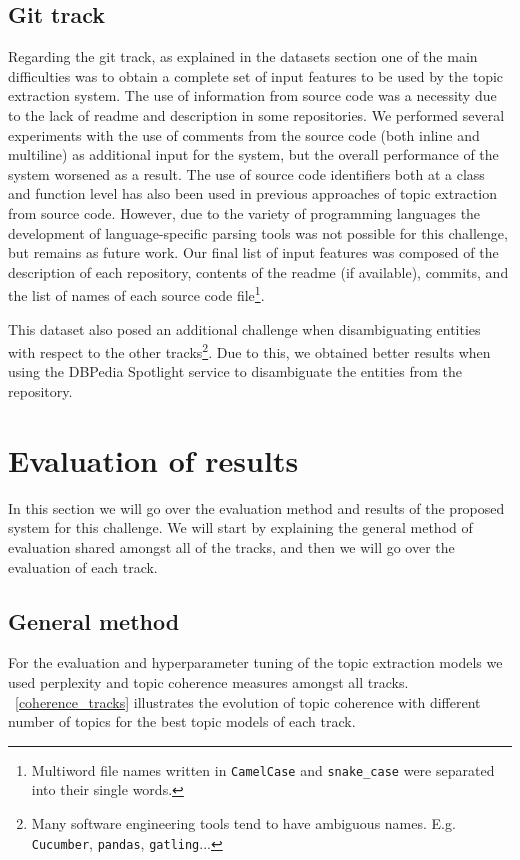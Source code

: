 \documentclass[runningheads]{llncs}
\begin{document}
\subsection{Git track}
Regarding the git track, as explained in the datasets section one of the main difficulties was to obtain a complete set of input features to be used by the topic extraction system. The use of information from source code was a necessity due to the lack of readme and description in some repositories. We performed several experiments with the use of comments from the source code (both inline and multiline) as additional input for the system, but the overall performance of the system worsened as a result. The use of source code identifiers both at a class and function level has also been used in previous approaches of topic extraction from source code. However, due to the variety of programming languages the development of language-specific parsing tools was not possible for this challenge, but remains as future work. Our final list of input features was composed of the description of each repository, contents of the readme (if available), commits, and the list of names of each source code file\footnote{Multiword file names written in \texttt{CamelCase} and \texttt{snake\_case} were separated into their single words.}.

This dataset also posed an additional challenge when disambiguating entities with respect to the other tracks\footnote{Many software engineering tools tend to have ambiguous names. E.g. \texttt{Cucumber}, \texttt{pandas}, \texttt{gatling}...}. Due to this, we obtained better results when using the DBPedia Spotlight service to disambiguate the entities from the repository.

\section{Evaluation of results} \label{evaluation}
In this section we will go over the evaluation method and results of the proposed system for this challenge. We will start by explaining the general method of evaluation shared amongst all of the tracks, and then we will go over the evaluation of each track.

\subsection{General method}
For the evaluation and hyperparameter tuning of the topic extraction models we used perplexity and topic coherence measures amongst all tracks. \figurename~\ref{coherence_tracks} illustrates the evolution of topic coherence with different number of topics for the best topic models of each track.
\end{document}
